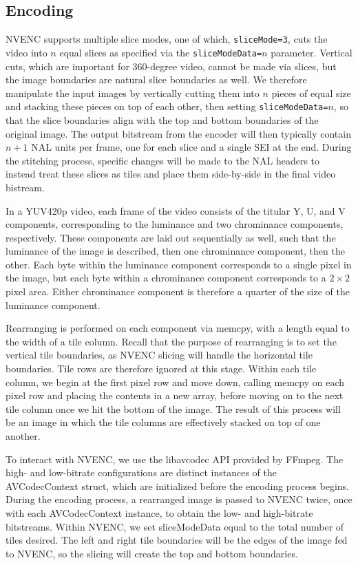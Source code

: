 \subsection{Encoding}
NVENC supports multiple slice modes, one of which, \texttt{sliceMode=3}, cuts the video into $n$ equal slices as specified via the \texttt{sliceModeData=}$n$ parameter. Vertical cuts, which are important for 360-degree video, cannot be made via slices, but the image boundaries are natural slice boundaries as well. We therefore manipulate the input images by vertically cutting them into $n$ pieces of equal size and stacking these pieces on top of each other, then setting \texttt{sliceModeData=}$n$, so that the slice boundaries align with the top and bottom boundaries of the original image. The output bitstream from the encoder will then typically contain $n+1$ NAL units per frame, one for each slice and a single SEI at the end. During the stitching process, specific changes will be made to the NAL headers to instead treat these slices as tiles and place them side-by-side in the final video bistream.

In a YUV420p video, each frame of the video consists of the titular Y, U, and V components, corresponding to the luminance and two chrominance components, respectively. These components are laid out sequentially as well, such that the luminance of the image is described, then one chrominance component, then the other. Each byte within the luminance component corresponds to a single pixel in the image, but each byte within a chrominance component corresponds to a $2\times2$ pixel area. Either chrominance component is therefore a quarter of the size of the luminance component.

Rearranging is performed on each component via memcpy, with a length equal to the width of a tile column. Recall that the purpose of rearranging is to set the vertical tile boundaries, as NVENC slicing will handle the horizontal tile boundaries. Tile rows are therefore ignored at this stage. Within each tile column, we begin at the first pixel row and move down, calling memcpy on each pixel row and placing the contents in a new array, before moving on to the next tile column once we hit the bottom of the image. The result of this process will be an image in which the tile columns are effectively stacked on top of one another.

To interact with NVENC, we use the libavcodec API provided by FFmpeg. The high- and low-bitrate configurations are distinct instances of the AVCodecContext struct, which are initialized before the encoding process begins. During the encoding process, a rearranged image is passed to NVENC twice, once with each AVCodecContext instance, to obtain the low- and high-bitrate bitstreams. Within NVENC, we set sliceModeData equal to the total number of tiles desired. The left and right tile boundaries will be the edges of the image fed to NVENC, so the slicing will create the top and bottom boundaries.


